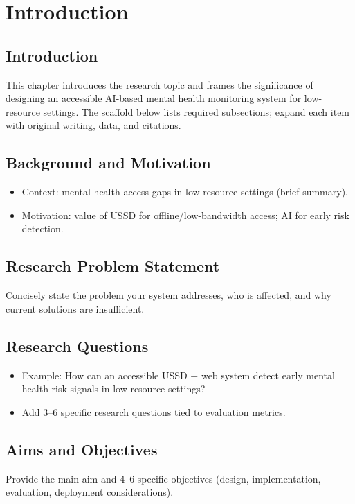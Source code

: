 \chapter{Introduction}
\label{ch:intro}

\section{Introduction}
\noindent This chapter introduces the research topic and frames the significance of designing an accessible AI-based mental health monitoring system for low-resource settings. The scaffold below lists required subsections; expand each item with original writing, data, and citations.

\section{Background and Motivation}
\begin{itemize}
  \item Context: mental health access gaps in low-resource settings (brief summary).
  \item Motivation: value of USSD for offline/low-bandwidth access; AI for early risk detection.
\end{itemize}

\section{Research Problem Statement}
\noindent Concisely state the problem your system addresses, who is affected, and why current solutions are insufficient.

\section{Research Questions}
\begin{itemize}
  \item Example: How can an accessible USSD + web system detect early mental health risk signals in low-resource settings?
  \item Add 3–6 specific research questions tied to evaluation metrics.
\end{itemize}

\section{Aims and Objectives}
\noindent Provide the main aim and 4–6 specific objectives (design, implementation, evaluation, deployment considerations).

